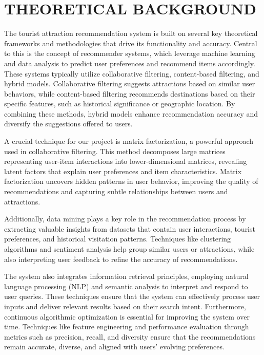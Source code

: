\chapter{THEORETICAL BACKGROUND}
\noindent
The tourist attraction recommendation system is built on several key theoretical frameworks and methodologies that drive its functionality and accuracy. Central to this is the concept of recommender systems, which leverage machine learning and data analysis to predict user preferences and recommend items accordingly. These systems typically utilize collaborative filtering, content-based filtering, and hybrid models. Collaborative filtering suggests attractions based on similar user behaviors, while content-based filtering recommends destinations based on their specific features, such as historical significance or geographic location. By combining these methods, hybrid models enhance recommendation accuracy and diversify the suggestions offered to users.

A crucial technique for our project is matrix factorization, a powerful approach used in collaborative filtering. This method decomposes large matrices representing user-item interactions into lower-dimensional matrices, revealing latent factors that explain user preferences and item characteristics. Matrix factorization uncovers hidden patterns in user behavior, improving the quality of recommendations and capturing subtle relationships between users and attractions.

Additionally, data mining plays a key role in the recommendation process by extracting valuable insights from datasets that contain user interactions, tourist preferences, and historical visitation patterns. Techniques like clustering algorithms and sentiment analysis help group similar users or attractions, while also interpreting user feedback to refine the accuracy of recommendations.

The system also integrates information retrieval principles, employing natural language processing (NLP) and semantic analysis to interpret and respond to user queries. These techniques ensure that the system can effectively process user inputs and deliver relevant results based on their search intent. Furthermore, continuous algorithmic optimization is essential for improving the system over time. Techniques like feature engineering and performance evaluation through metrics such as precision, recall, and diversity ensure that the recommendations remain accurate, diverse, and aligned with users' evolving preferences.

